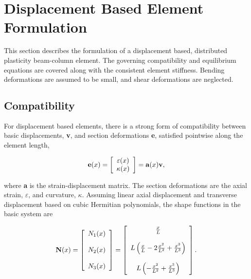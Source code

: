 \documentclass[12pt]{article}
\begin{document}
\section{Displacement Based Element Formulation}
This section describes the formulation of a displacement based, distributed plasticity
beam-column element. The governing compatibility and equilibrium equations are covered
along with the consistent element stiffness. Bending deformations are assumed to be
small, and shear deformations are neglected.

\subsection{Compatibility}
For displacement based elements, there is a strong form of compatibility between
basic displacements, {\bf v}, and section deformations {\bf e}, satisfied
pointwise along the element length,

\begin{equation}
\label{eq:e=av}
{\bf e}(x) =
\left[ \begin{array}{c} \varepsilon(x) \\ \kappa(x) \end{array} \right] =
{\bf a}(x) {\bf v},
\end{equation}

\noindent where {\bf a} is the strain-displacement matrix. The section deformations
are the axial strain, $\varepsilon$, and curvature, $\kappa$. Assuming linear axial
displacement and transverse displacement based on cubic Hermitian polynomials,
the shape functions in the basic system are

\begin{equation}
\label{eq:N}
{\bf N}(x) =
\left[ \begin{array}{c} N_1(x) \\ \\ N_2(x) \\ \\ N_3(x) \end{array} \right] =
\left[ \begin{array}{c} \frac{x}{L} \\ \\
L\left( \frac{x}{L} - 2\frac{x^2}{L^2} + \frac{x^3}{L^3} \right) \\ \\
L\left( -\frac{x^2}{L^2} + \frac{x^3}{L^3} \right)
\end{array}
\right].
\end{equation}
\end{document}
